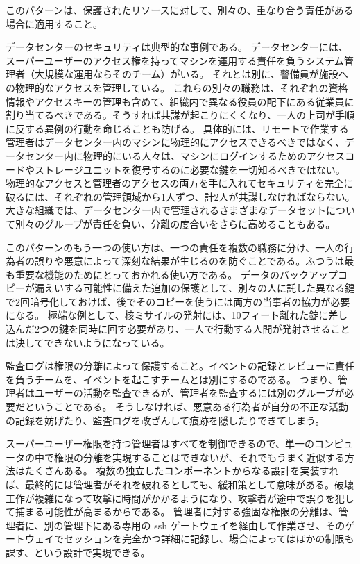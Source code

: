 \documentclass[uplatex]{jsarticle}
\def\label#1{}%
\begin{document}
このパターンは、保護されたリソースに対して、別々の、重なり合う責任がある場合に適用すること。

\begin{exa}[データセンターのセキュリティ]\label{exa:ch4-datacenter}
データセンターのセキュリティは典型的な事例である。
データセンターには、スーパーユーザーのアクセス権を持ってマシンを運用する責任を負うシステム管理者（大規模な運用ならそのチーム）がいる。
それとは別に、警備員が施設への物理的なアクセスを管理している。
これらの別々の職務は、それぞれの資格情報やアクセスキーの管理も含めて、組織内で異なる役員の配下にある従業員に割り当てるべきである。そうすれば共謀が起こりにくくなり、一人の上司が手順に反する異例の行動を命じることも防げる。
具体的には、リモートで作業する管理者はデータセンター内のマシンに物理的にアクセスできるべきではなく、データセンター内に物理的にいる人々は、マシンにログインするためのアクセスコードやストレージユニットを復号するのに必要な鍵を一切知るべきではない。
物理的なアクセスと管理者のアクセスの両方を手に入れてセキュリティを完全に破るには、それぞれの管理領域から1人ずつ、計2人が共謀しなければならない。
大きな組織では、データセンター内で管理されるさまざまなデータセットについて別々のグループが責任を負い、分離の度合いをさらに高めることもある。
\end{exa}

このパターンのもう一つの使い方は、一つの責任を複数の職務に分け、一人の行為者の誤りや悪意によって深刻な結果が生じるのを防ぐことである。ふつうは最も重要な機能のためにとっておかれる使い方である。
データのバックアップコピーが漏えいする可能性に備えた追加の保護として、別々の人に託した異なる鍵で2回暗号化しておけば、後でそのコピーを使うには両方の当事者の協力が必要になる。
極端な例として、核ミサイルの発射には、10フィート離れた錠に差し込んだ2つの鍵を同時に回す必要があり、一人で行動する人間が発射させることは決してできないようになっている。

監査ログは権限の分離によって保護すること。イベントの記録とレビューに責任を負うチームを、イベントを起こすチームとは別にするのである。
つまり、管理者はユーザーの活動を監査できるが、管理者を監査するには別のグループが必要だということである。
そうしなければ、悪意ある行為者が自分の不正な活動の記録を妨げたり、監査ログを改ざんして痕跡を隠したりできてしまう。

スーパーユーザー権限を持つ管理者はすべてを制御できるので、単一のコンピュータの中で権限の分離を実現することはできないが、それでもうまく近似する方法はたくさんある。
複数の独立したコンポーネントからなる設計を実装すれば、最終的には管理者がそれを破れるとしても、緩和策として意味がある。破壊工作が複雑になって攻撃に時間がかかるようになり、攻撃者が途中で誤りを犯して捕まる可能性が高まるからである。
管理者に対する強固な権限の分離は、管理者に、別の管理下にある専用の ssh ゲートウェイを経由して作業させ、そのゲートウェイでセッションを完全かつ詳細に記録し、場合によってはほかの制限も課す、という設計で実現できる。
\end{document}
